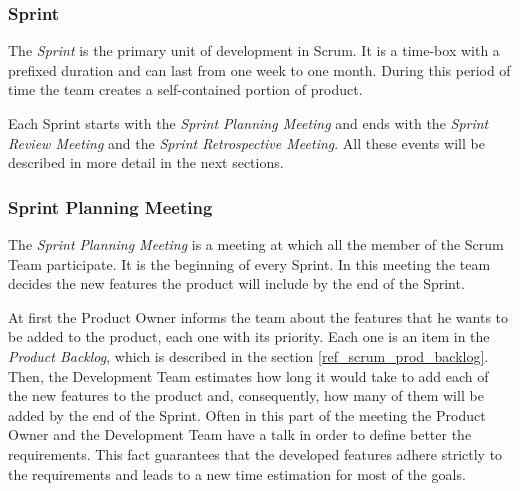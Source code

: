 			
			\subsubsection{Sprint}\label{ref_scrum_sprint}
			The \emph{Sprint} is the primary unit of development in Scrum. It is a time-box with a prefixed duration and can last from one week to one month. During this period of time the team creates a self-contained portion of product. 

			Each Sprint starts with the \emph{Sprint Planning Meeting} and ends with the \emph{Sprint Review Meeting} and the \emph{Sprint Retrospective Meeting}. All these events will be described in more detail in the next sections.  
		

			\subsubsection{Sprint Planning Meeting}\label{ref_scrum_sprint_plan}
			The \emph{Sprint Planning Meeting} is a meeting at which all the member of the Scrum Team participate. It is the beginning of every Sprint. In this meeting the team decides the new features the product will include by the end of the Sprint.

			At first the Product Owner informs the team about the features that he wants to be added to the product, each one with its priority. Each one is an item in the \emph{Product Backlog}, which is described in the section \ref{ref_scrum_prod_backlog}. Then, the Development Team estimates how long it would take to add each of the new features to the product and, consequently, how many of them will be added by the end of the Sprint. Often in this part of the meeting the Product Owner and the Development Team have a talk in order to define better the requirements. This fact guarantees that the developed features adhere strictly to the requirements and leads to a new time estimation for most of the goals. 

